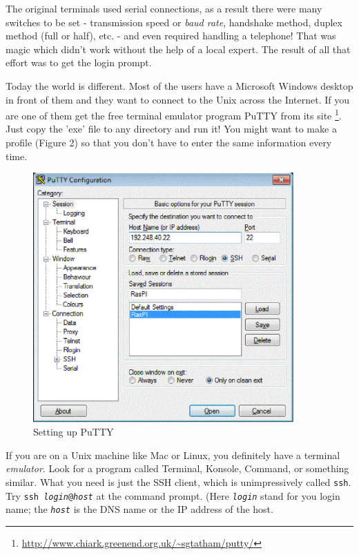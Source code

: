 \documentclass[11pt,a4paper,twoside]{article}
\begin{document}
The original terminals used serial connections, as a result there were
many switches to be set - transmission speed or \emph{baud rate}, handshake
method, duplex method (full or half), etc. - and even required handling a 
telephone! That was magic which didn't work without the help of a local 
expert. The result of all that effort was to get the login prompt.

Today the world is different. Most of the users have a Microsoft Windows 
desktop in front of them and they want to connect to the Unix across the
Internet.  If you are one of them get the free terminal emulator program 
PuTTY from its site 
\footnote{\url{http://www.chiark.greenend.org.uk/~sgtatham/putty/}}. 
Just copy the 'exe' file to any directory and run it! You might want to 
make a profile (Figure 2) so that you don't have to enter the same 
information every time.
\begin{figure}[htb]
  \begin{center}
    \includegraphics[width=10cm]{images/putty}
    \caption{Setting up PuTTY}
  \end{center}
\end{figure}

If you are on a Unix machine like Mac or Linux, you definitely have a 
terminal \textsl{emulator}. Look for a program called Terminal, Konsole,
Command, or something similar. What you need is just the SSH client, 
which is unimpressively called \texttt{ssh}. Try 
\texttt{ssh \emph{login}@\emph{host}} at the command prompt.  (Here 
\texttt{\emph{login}} stand for you login name; the \texttt{\emph{host}} 
is the DNS name or the IP address of the host. 
\end{document}
